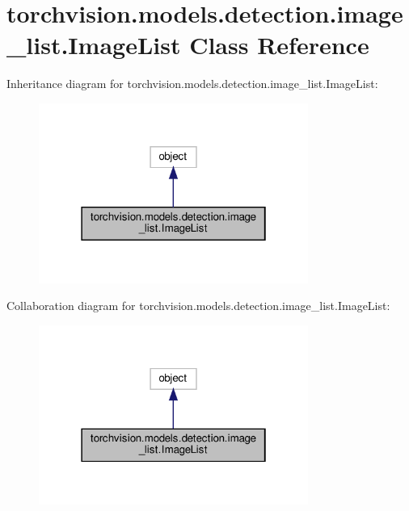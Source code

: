 \hypertarget{classtorchvision_1_1models_1_1detection_1_1image__list_1_1ImageList}{}\section{torchvision.\+models.\+detection.\+image\+\_\+list.\+Image\+List Class Reference}
\label{classtorchvision_1_1models_1_1detection_1_1image__list_1_1ImageList}


Inheritance diagram for torchvision.\+models.\+detection.\+image\+\_\+list.\+Image\+List\+:
\nopagebreak
\begin{figure}[H]
\begin{center}
\leavevmode
\includegraphics[width=250pt]{classtorchvision_1_1models_1_1detection_1_1image__list_1_1ImageList__inherit__graph}
\end{center}
\end{figure}


Collaboration diagram for torchvision.\+models.\+detection.\+image\+\_\+list.\+Image\+List\+:
\nopagebreak
\begin{figure}[H]
\begin{center}
\leavevmode
\includegraphics[width=250pt]{classtorchvision_1_1models_1_1detection_1_1image__list_1_1ImageList__coll__graph}
\end{center}
\end{figure}
